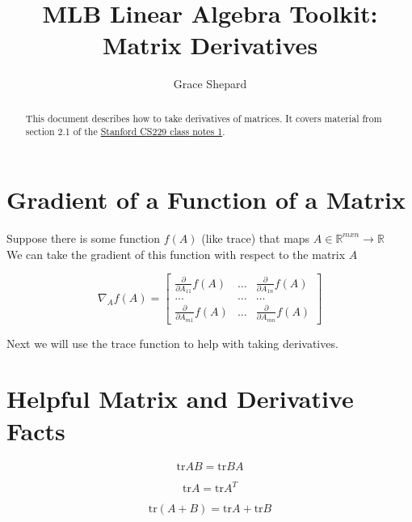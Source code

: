 \documentclass{article}
\begin{document}
\title{MLB Linear Algebra Toolkit: Matrix Derivatives}
\author{Grace Shepard}

\maketitle

\begin{abstract}
This document describes how to take derivatives of matrices. It covers material from section 2.1 of the \href{https://see.stanford.edu/materials/aimlcs229/cs229-notes1.pdf}{Stanford CS229 class notes 1}.
\end{abstract}

\section{Gradient of a Function of a Matrix}
Suppose there is some function $f(A)$ (like trace) that maps $A \in \mathbb{R}^{mxn} \rightarrow \mathbb{R}$ \\
We can take the gradient of this function with respect to the matrix $A$\\
\begin{center}
\[
\nabla_A f(A) =
\begin{bmatrix}
\frac{\partial}{\partial A_{11}} f(A) & \dots & \frac{\partial}{\partial A_{1n}} f(A)\\
\dots & \dots & \dots \\    
\frac{\partial}{\partial A_{m1}} f(A) & \dots & \frac{\partial}{\partial A_{mn}} f(A)   
\end{bmatrix}
\]
\end{center}
Next we will use the trace function to help with taking derivatives.


\section{Helpful Matrix and Derivative Facts}

\begin{equation}
\text{tr}AB = \text{tr}BA
\end{equation}

\begin{equation}
\text{tr}A = \text{tr}A^T
\end{equation}

\begin{equation}
\text{tr}(A+B) = \text{tr}A +\text{tr}B
\end{equation}
\end{document}
